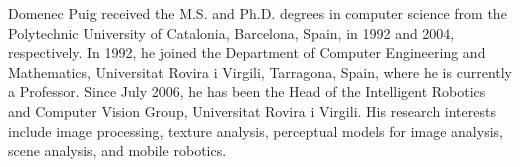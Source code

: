 \documentclass[journal]{IEEEtran}
\begin{document}
\begin{IEEEbiography}
{Domenec Puig}
received the M.S. and Ph.D. degrees in computer science from the Polytechnic University of Catalonia, Barcelona, Spain, in 1992 and 2004, respectively. In 1992, he joined the Department of Computer Engineering and Mathematics, Universitat Rovira i Virgili, Tarragona, Spain, where he is currently a Professor. Since July 2006, he has been the Head of the Intelligent Robotics and Computer Vision Group, Universitat Rovira i Virgili. His research interests include image processing, texture analysis, perceptual models for image analysis, scene analysis, and mobile robotics.
\end{IEEEbiography}
\end{document}
